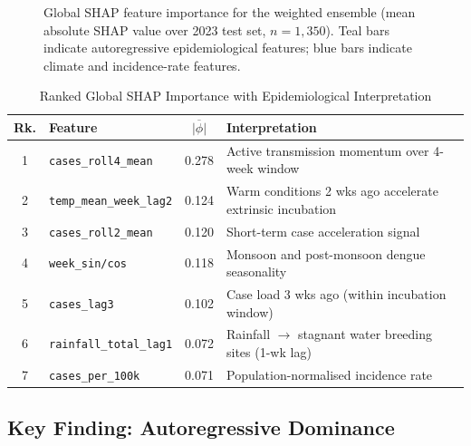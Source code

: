 \documentclass[conference]{IEEEtran}
\begin{document}
\begin{figure}[htbp]
  \caption{Global SHAP feature importance for the weighted ensemble
  (mean absolute SHAP value over 2023 test set, $n=1{,}350$). Teal
  bars indicate autoregressive epidemiological features; blue bars
  indicate climate and incidence-rate features.}
  \label{fig:shap_bar}
\end{figure}

\begin{table}[htbp]
  \caption{Ranked Global SHAP Importance with Epidemiological Interpretation}
  \label{tab:shap}
  \centering
  \renewcommand{\arraystretch}{1.2}
  \setlength{\tabcolsep}{3pt}
  \begin{tabular}{clcL{3.4cm}}
    \toprule
    \textbf{Rk.} & \textbf{Feature} &
    \textbf{$\overline{|\phi|}$} & \textbf{Interpretation} \\
     & \texttt{cases\_roll4\_mean}       & 0.278 & Active transmission
        momentum over 4-week window \\
    2 & \texttt{temp\_mean\_week\_lag2}   & 0.124 & Warm conditions 2 wks ago
        accelerate extrinsic incubation \\
    3 & \texttt{cases\_roll2\_mean}       & 0.120 & Short-term case
        acceleration signal \\
    4 & \texttt{week\_sin/cos}            & 0.118 & Monsoon and post-monsoon
        dengue seasonality \\
    5 & \texttt{cases\_lag3}              & 0.102 & Case load 3 wks ago
        (within incubation window) \\
    6 & \texttt{rainfall\_total\_lag1}    & 0.072 & Rainfall $\to$ stagnant
        water breeding sites (1-wk lag) \\
    7 & \texttt{cases\_per\_100k}         & 0.071 & Population-normalised
        incidence rate \\
    \bottomrule
  \end{tabular}
\end{table}

\subsection{Key Finding: Autoregressive Dominance}
\end{document}
